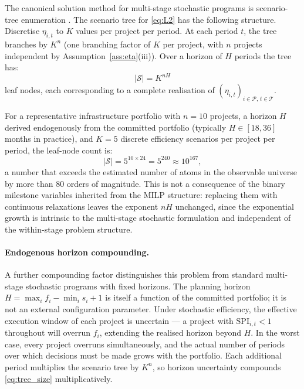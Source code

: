 The canonical solution method for multi-stage stochastic programs is
scenario-tree enumeration \citep{Birge2011}. The scenario tree for
\eqref{eq:L2} has the following structure. Discretise $\eta_{i,t}$ to
$K$ values per project per period. At each period $t$, the tree branches
by $K^n$ (one branching factor of $K$ per project, with $n$ projects
independent by Assumption~\ref{ass:eta}(iii)). Over a horizon of $H$
periods the tree has:
\begin{equation}
  |\mathcal{S}| = K^{nH}
  \label{eq:tree_size}
\end{equation}
leaf nodes, each corresponding to a complete realisation of
$(\eta_{i,t})_{i \in \mathcal{P},\, t \in \mathcal{T}}$.

For a representative infrastructure portfolio with $n = 10$ projects,
a horizon $H$ derived endogenously from the committed portfolio
(typically $H \in [18, 36]$ months in practice), and $K = 5$ discrete
efficiency scenarios per project per period, the leaf-node count is:
\begin{equation}
  |\mathcal{S}| = 5^{10 \times 24} = 5^{240}
    \approx 10^{167},
  \label{eq:tree_example}
\end{equation}
a number that exceeds the estimated number of atoms in the observable
universe by more than 80 orders of magnitude. This is not a
consequence of the binary milestone variables inherited from the MILP
structure: replacing them with continuous relaxations leaves the
exponent $nH$ unchanged, since the exponential growth is intrinsic to
the multi-stage stochastic formulation and independent of the
within-stage problem structure.

\paragraph{Endogenous horizon compounding.}
A further compounding factor distinguishes this problem from standard
multi-stage stochastic programs with fixed horizons. The planning
horizon $H = \max_i f_i - \min_i s_i + 1$ is itself a function of the
committed portfolio; it is not an external configuration parameter.
Under stochastic efficiency, the effective execution window of each
project is uncertain --- a project with $\mathrm{SPI}_{i,t} < 1$
throughout will overrun $f_i$, extending the realised horizon beyond
$H$. In the worst case, every project overruns simultaneously, and the
actual number of periods over which decisions must be made grows with
the portfolio. Each additional period multiplies the scenario tree by
$K^n$, so horizon uncertainty compounds \eqref{eq:tree_size}
multiplicatively.

